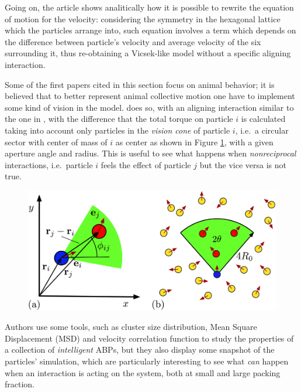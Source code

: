 \documentclass[../../master_thesis_np.tex]{subfiles}
\begin{document}
	Going on, the article shows analitically how it is possible to rewrite the equation of motion for the velocity: considering the symmetry in the hexagonal lattice which the particles arrange into, such equation involves a term which depends on the difference between particle's velocity and average velocity of the six surrounding it, thus re-obtaining a Vicsek-like model without a specific aligning interaction.
	
	Some of the first papers cited in this section focus on animal behavior; it is believed that to better represent animal collective motion one have to implement some kind of vision in the model. \parencite{negi_emergent_2022} does so, with an aligning interaction similar to the one in \parencite{martin-gomez_collective_2018}, with the difference that the total torque on particle $i$ is calculated taking into account only particles in the \emph{vision cone} of particle $i$, i.e.\ a circular sector with center of mass of $i$ as center as shown in Figure \ref{fig:negi_vision1}, with a given aperture angle and radius. This is useful to see what happens when \emph{nonreciprocal} interactions, i.e.\ particle $i$ feels the effect of particle $j$ but the vice versa is not true.
	
	\begin{figure}[htp]
		\centering
		\includegraphics[width=\singfigwidth]{negi_vision1.png}
		\caption{\parencite{negi_emergent_2022}}
		\label{fig:negi_vision1}
	\end{figure}
	
	
	Authors use some tools, such as cluster size distribution, Mean Square Displacement (MSD) and velocity correlation function to study the properties of a collection of \emph{intelligent} ABPs, but they also display some snapshot of the particles' simulation, which are particularly interesting to see what \emph{can} happen when an interaction is acting on the system, both at small and large packing fraction. 
	
\end{document}
